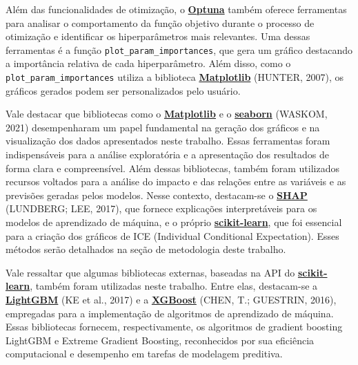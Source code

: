 \documentclass[
  12pt,
  a4paper,
]{scrreprt}
\begin{document}
\vspace{12pt}

Além das funcionalidades de otimização, o
\href{https://optuna.org/}{\textbf{Optuna}} também oferece ferramentas
para analisar o comportamento da função objetivo durante o processo de
otimização e identificar os hiperparâmetros mais relevantes. Uma dessas
ferramentas é a função \texttt{plot\_param\_importances}, que gera um
gráfico destacando a importância relativa de cada hiperparâmetro. Além
disso, como o \texttt{plot\_param\_importances} utiliza a biblioteca
\href{https://matplotlib.org/}{\textbf{Matplotlib}} (HUNTER, 2007), os
gráficos gerados podem ser personalizados pelo usuário.

\vspace{12pt}

Vale destacar que bibliotecas como o
\href{https://matplotlib.org/}{\textbf{Matplotlib}} e o
\href{https://seaborn.pydata.org/}{\textbf{seaborn}} (WASKOM, 2021)
desempenharam um papel fundamental na geração dos gráficos e na
visualização dos dados apresentados neste trabalho. Essas ferramentas
foram indispensáveis para a análise exploratória e a apresentação dos
resultados de forma clara e compreensível. Além dessas bibliotecas,
também foram utilizados recursos voltados para a análise do impacto e
das relações entre as variáveis e as previsões geradas pelos modelos.
Nesse contexto, destacam-se o
\href{https://shap.readthedocs.io/en/latest}{\textbf{SHAP}} (LUNDBERG;
LEE, 2017), que fornece explicações interpretáveis para os modelos de
aprendizado de máquina, e o próprio
\href{https://scikit-learn.org/stable/}{\textbf{scikit-learn}}, que foi
essencial para a criação dos gráficos de ICE (Individual Conditional
Expectation). Esses métodos serão detalhados na seção de metodologia
deste trabalho.

\vspace{12pt}

Vale ressaltar que algumas bibliotecas externas, baseadas na API do
\href{https://scikit-learn.org/stable/}{\textbf{scikit-learn}}, também
foram utilizadas neste trabalho. Entre elas, destacam-se a
\href{https://lightgbm.readthedocs.io/en/stable/}{\textbf{LightGBM}} (KE
et al., 2017) e a
\href{https://xgboost.readthedocs.io/en/stable/}{\textbf{XGBoost}}
(CHEN, T.; GUESTRIN, 2016), empregadas para a implementação de
algoritmos de aprendizado de máquina. Essas bibliotecas fornecem,
respectivamente, os algoritmos de gradient boosting LightGBM e Extreme
Gradient Boosting, reconhecidos por sua eficiência computacional e
desempenho em tarefas de modelagem preditiva.
\end{document}
